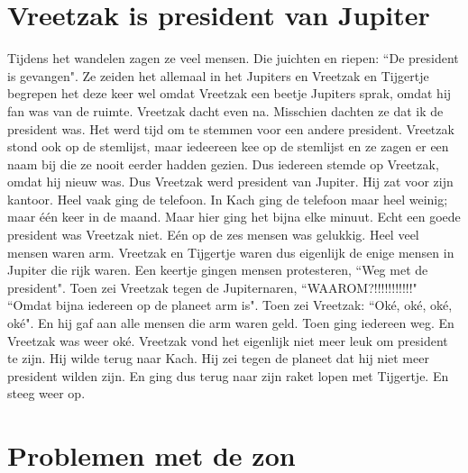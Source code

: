 \documentclass{article}
\begin{document}
\section{Vreetzak is president van Jupiter}

Tijdens het wandelen zagen ze veel mensen. Die juichten en riepen: ``De president is gevangen". Ze zeiden het allemaal in het Jupiters en Vreetzak en Tijgertje begrepen het deze keer wel omdat Vreetzak een beetje Jupiters sprak, omdat hij fan was van de ruimte. Vreetzak dacht even na. Misschien dachten ze dat ik de president was. Het werd tijd om te stemmen voor een andere president. Vreetzak stond ook op de stemlijst, maar iedeereen kee op de stemlijst en ze zagen er een naam bij die ze nooit eerder hadden gezien. Dus iedereen stemde op Vreetzak, omdat hij nieuw was. Dus Vreetzak werd president van Jupiter. Hij zat voor zijn kantoor. Heel vaak ging de telefoon. In Kach ging de telefoon maar heel weinig; maar één keer in de maand. Maar hier ging het bijna elke minuut. Echt een goede president was Vreetzak niet. Eén op de zes mensen was gelukkig. Heel veel mensen waren arm. Vreetzak en Tijgertje waren dus eigenlijk de enige mensen in Jupiter die rijk waren. Een keertje gingen mensen protesteren, ``Weg met de president". Toen zei Vreetzak tegen de Jupiternaren, ``WAAROM?!!!!!!!!!!!" ``Omdat bijna iedereen op de planeet arm is". Toen zei Vreetzak: ``Oké, oké, oké, oké". En hij gaf aan alle mensen die arm waren geld. Toen ging iedereen weg. En Vreetzak was weer oké. Vreetzak vond het eigenlijk niet meer leuk om president te zijn. Hij wilde terug naar Kach. Hij zei tegen de planeet dat hij niet meer president wilden zijn. En ging dus terug naar zijn raket lopen met Tijgertje. En steeg weer op.
\section{Problemen met de zon}
\end{document}
